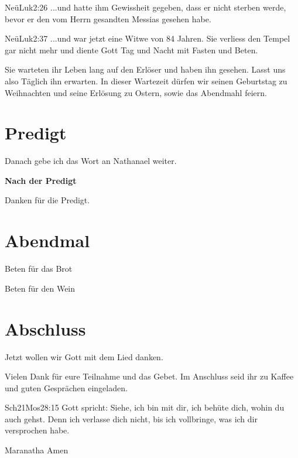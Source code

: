 \documentclass{../inc/mybib}
\begin{document}
\begin{spacing}{1.5}
\begin{bibeltext}{Neü}{Luk}{2:26}
...und hatte ihm Gewissheit gegeben, dass er nicht sterben werde, bevor er den vom Herrn gesandten Messias gesehen habe.
\end{bibeltext}

\begin{bibeltext}{Neü}{Luk}{2:37}
...und war jetzt eine Witwe von 84 Jahren. Sie verliess den Tempel gar nicht mehr und diente Gott Tag und Nacht mit Fasten und Beten.
\end{bibeltext}

Sie warteten ihr Leben lang auf den Erlöser und haben ihn gesehen. Lasst uns also Täglich ihn erwarten. In dieser Wartezeit dürfen wir seinen Geburtstag zu Weihnachten und seine Erlösung zu Ostern, sowie das Abendmahl feiern.

\end{spacing}


\section{Predigt}

Danach gebe ich das Wort an Nathanael weiter.

\textbf{Nach der Predigt}

Danken für die Predigt.

\section{Abendmal}

Beten für das Brot


Beten für den Wein



\section{Abschluss}

Jetzt wollen wir Gott mit dem Lied  danken.


Vielen Dank für eure Teilnahme und das Gebet. Im Anschluss seid ihr zu Kaffee und guten Gesprächen eingeladen.
\beten{}

\begin{bibeltext}{Sch2}{1Mos}{28:15}
Gott spricht: Siehe, ich bin mit dir,
ich behüte dich, wohin du auch gehst.
Denn ich verlasse dich nicht,
bis ich vollbringe, was ich dir versprochen habe.
\end{bibeltext}

Maranatha Amen
\end{document}
